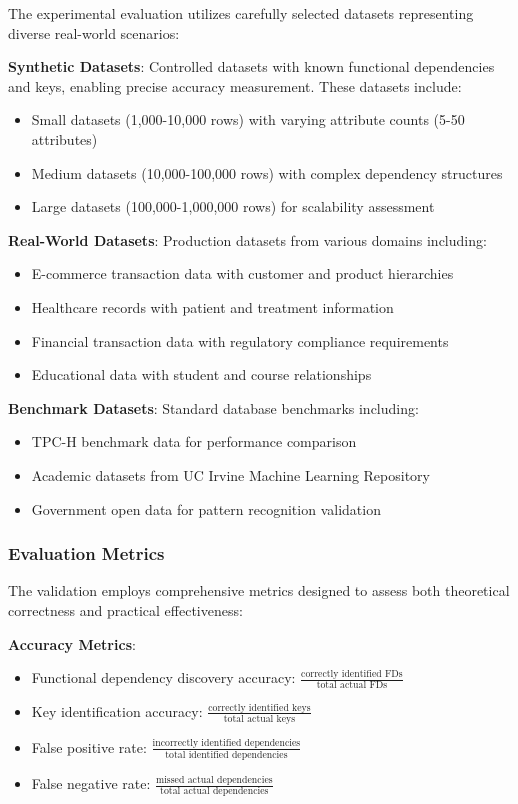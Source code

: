\documentclass[acmsmall]{acmart}
\begin{document}
The experimental evaluation utilizes carefully selected datasets representing diverse real-world scenarios:

\textbf{Synthetic Datasets}: Controlled datasets with known functional dependencies and keys, enabling precise accuracy measurement. These datasets include:
\begin{itemize}
\item Small datasets (1,000-10,000 rows) with varying attribute counts (5-50 attributes)
\item Medium datasets (10,000-100,000 rows) with complex dependency structures
\item Large datasets (100,000-1,000,000 rows) for scalability assessment
\end{itemize}

\textbf{Real-World Datasets}: Production datasets from various domains including:
\begin{itemize}
\item E-commerce transaction data with customer and product hierarchies
\item Healthcare records with patient and treatment information
\item Financial transaction data with regulatory compliance requirements
\item Educational data with student and course relationships
\end{itemize}

\textbf{Benchmark Datasets}: Standard database benchmarks including:
\begin{itemize}
\item TPC-H benchmark data for performance comparison
\item Academic datasets from UC Irvine Machine Learning Repository
\item Government open data for pattern recognition validation
\end{itemize}

\subsubsection{Evaluation Metrics}

The validation employs comprehensive metrics designed to assess both theoretical correctness and practical effectiveness:

\textbf{Accuracy Metrics}:
\begin{itemize}
\item Functional dependency discovery accuracy: $\frac{\text{correctly identified FDs}}{\text{total actual FDs}}$
\item Key identification accuracy: $\frac{\text{correctly identified keys}}{\text{total actual keys}}$
\item False positive rate: $\frac{\text{incorrectly identified dependencies}}{\text{total identified dependencies}}$
\item False negative rate: $\frac{\text{missed actual dependencies}}{\text{total actual dependencies}}$
\end{itemize}
\end{document}
